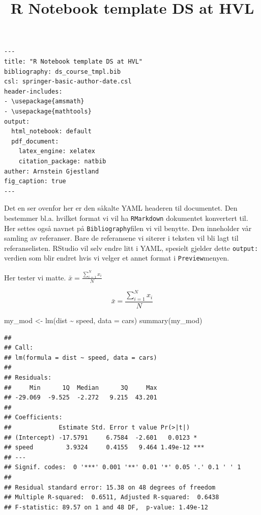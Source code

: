 \documentclass[
]{article}
\title{R Notebook template DS at HVL}
\author{}
\date{\vspace{-2.5em}}
\newenvironment{Shaded}{\begin{snugshade}}{\end{snugshade}}
\newcommand{\AttributeTok}[1]{\textcolor[rgb]{0.77,0.63,0.00}{#1}}
\newcommand{\FunctionTok}[1]{\textcolor[rgb]{0.00,0.00,0.00}{#1}}
\newcommand{\NormalTok}[1]{#1}
\newcommand{\OtherTok}[1]{\textcolor[rgb]{0.56,0.35,0.01}{#1}}
\newcommand{\SpecialCharTok}[1]{\textcolor[rgb]{0.00,0.00,0.00}{#1}}
\begin{document}
\maketitle

\begin{verbatim}
---
title: "R Notebook template DS at HVL"
bibliography: ds_course_tmpl.bib
csl: springer-basic-author-date.csl
header-includes:
- \usepackage{amsmath}
- \usepackage{mathtools}
output:
  html_notebook: default
  pdf_document:
    latex_engine: xelatex
    citation_package: natbib
auther: Arnstein Gjestland
fig_caption: true
---
\end{verbatim}

Det en ser ovenfor her er den såkalte YAML headeren til documentet. Den
bestemmer bl.a. hvilket format vi vil ha \texttt{RMarkdown} dokumentet
konvertert til. Her settes også navnet på \texttt{Bibliography}filen vi
vil benytte. Den inneholder vår samling av referanser. Bare de
referansene vi siterer i teksten vil bli lagt til referanselisten.
RStudio vil selv endre litt i YAML, spesielt gjelder dette
\texttt{output:} verdien som blir endret hvis vi velger et annet format
i \texttt{Preview}menyen.

Her tester vi matte. \(\bar{x} = \frac{\sum_{i=1}^{N} x_i}{N}\)

\[\bar{x} = \frac{\sum_{i=1}^{N} x_i}{N}\]

\begin{Shaded}
\begin{Highlighting}[]
\NormalTok{my\_mod }\OtherTok{\textless{}{-}} \FunctionTok{lm}\NormalTok{(dist }\SpecialCharTok{\textasciitilde{}}\NormalTok{ speed, }\AttributeTok{data =}\NormalTok{ cars)}
\FunctionTok{summary}\NormalTok{(my\_mod)}
\end{Highlighting}
\end{Shaded}

\begin{verbatim}
## 
## Call:
## lm(formula = dist ~ speed, data = cars)
## 
## Residuals:
##     Min      1Q  Median      3Q     Max 
## -29.069  -9.525  -2.272   9.215  43.201 
## 
## Coefficients:
##             Estimate Std. Error t value Pr(>|t|)    
## (Intercept) -17.5791     6.7584  -2.601   0.0123 *  
## speed         3.9324     0.4155   9.464 1.49e-12 ***
## ---
## Signif. codes:  0 '***' 0.001 '**' 0.01 '*' 0.05 '.' 0.1 ' ' 1
## 
## Residual standard error: 15.38 on 48 degrees of freedom
## Multiple R-squared:  0.6511, Adjusted R-squared:  0.6438 
## F-statistic: 89.57 on 1 and 48 DF,  p-value: 1.49e-12
\end{verbatim}
\end{document}
